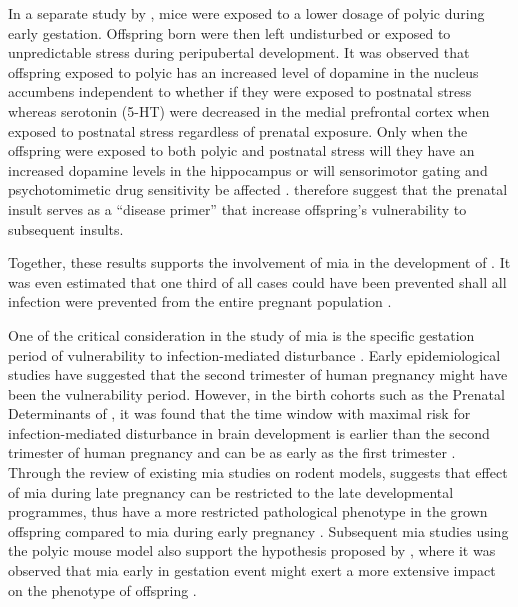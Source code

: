 \documentclass[12pt]{scrbook}
\newcommand*{\glng}{\glsentrylong}
\newcommand*{\Glng}{\Glsentrylong}
\begin{document}
	In a separate study by \citet{Giovanoli2013}, mice were exposed to a lower dosage of \gls{polyic} during early gestation.
	Offspring born were then left undisturbed or exposed to unpredictable stress during peripubertal development.
	It was observed that offspring exposed to \gls{polyic} has an increased level of dopamine in the nucleus accumbens independent to whether if they were exposed to postnatal stress whereas serotonin (5-HT) were decreased in the medial prefrontal cortex when exposed to postnatal stress regardless of prenatal exposure.
	Only when the offspring were exposed to both \gls{polyic} and postnatal stress will they have an increased dopamine levels in the hippocampus or will sensorimotor gating and psychotomimetic drug sensitivity be affected \citep{Giovanoli2013}.
	\citet{Giovanoli2013} therefore suggest that the prenatal insult serves as a ``disease primer'' that increase offspring's vulnerability to subsequent insults.
	
	Together, these results supports the involvement of \gls{mia} in the development of \glng{scz}.
	It was even estimated that one third of all \glng{scz} cases could have been prevented shall all infection were prevented from the entire pregnant population \citep{Brown2010}.
	
	One of the critical consideration in the study of \gls{mia} is the specific gestation period of vulnerability to infection-mediated disturbance \citep{Meyer2007a}.
	Early epidemiological studies have suggested that the second trimester of human pregnancy might have been the vulnerability period.
	However, in the birth cohorts such as the Prenatal Determinants of \Glng{scz}, it was found that the time window with maximal risk for infection-mediated disturbance in brain development is earlier than the second trimester of human pregnancy and can be as early as the first trimester \citep{Meyer2007a}.
	Through the review of existing \gls{mia} studies on rodent models, \citet{Meyer2007a} suggests that effect of \gls{mia} during late pregnancy can be restricted to the late developmental programmes, thus have a more restricted pathological phenotype in the grown offspring compared to \gls{mia} during early pregnancy \citep{Meyer2007a}.
	Subsequent \gls{mia} studies using the \gls{polyic} mouse model also support the hypothesis proposed by \citet{Meyer2007a}, where it was observed that \gls{mia} early in gestation event might exert a more extensive impact on the phenotype of offspring \citep{Li2009c,Li2010a}.
	
\end{document}
